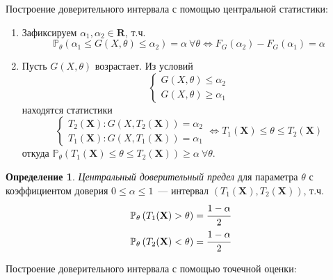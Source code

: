 \documentclass[oneside,final,14pt]{extreport}
\theoremstyle{plain}
\theoremstyle{definition}
\newtheorem*{defn}{Определение}
\theoremstyle{named}
\begin{document}
Построение доверительного интервала с помощью центральной статистики:
\begin{enumerate}
    \item Зафиксируем $\alpha_{1}, \alpha_{2} \in \mathbf{R}$, т.ч.
    \begin{equation*}
        \mathbb{P}_{\theta}(\alpha_{1} \leqslant G(X, \theta) \leqslant \alpha_{2})=\alpha~\forall \theta \Leftrightarrow F_{G}(\alpha_{2})-F_{G}(\alpha_{1})=\alpha
    \end{equation*}
    \item Пусть $G(X,\theta)$ возрастает. Из условий
    \begin{equation*}
        \left\{\begin{array}{l}
        G(X, \theta) \leqslant \alpha_{2} \\
        G(X, \theta) \geqslant \alpha_{1}
        \end{array}\right.
    \end{equation*}
    находятся статистики
    \begin{equation*}
        \left\{\begin{array}{l}
            T_{2}(\mathbf{X}): G(X, T_{2}(\mathbf{X}))=\alpha_{2} \\ 
            T_{1}(\mathbf{X}): G(X, T_{1}(\mathbf{X}))=\alpha_{1}
        \end{array} 
        \Leftrightarrow T_{1}(\mathbf{X}) \leqslant \theta \leqslant T_{2}(\mathbf{X})\right.
    \end{equation*}
    откуда $\mathbb{P}_{\theta}\left(T_{1}(\mathbf{X}) \leqslant \theta \leqslant T_{2}(\mathbf{X})\right) \geqslant \alpha~ \forall \theta$.
\end{enumerate}

\begin{defn}
{\it Центральный доверительный предел} для параметра $\theta$ с коэффициентом доверия $0 \leqslant \alpha \leqslant 1$~--- интервал $(T_1(\mathbf{X}), T_2(\mathbf{X}))$, т.ч. 
\begin{gather*}
    \mathbb{P}_{\theta}\left(T_{1}(\mathbf{X})>\theta\right)=\cfrac{1-\alpha}{2} \\
    \mathbb{P}_{\theta}\left(T_{2}(\mathbf{X})<\theta\right)=\cfrac{1-\alpha}{2}
\end{gather*}
\end{defn}

Построение доверительного интервала с помощью точечной оценки:
\end{document}
